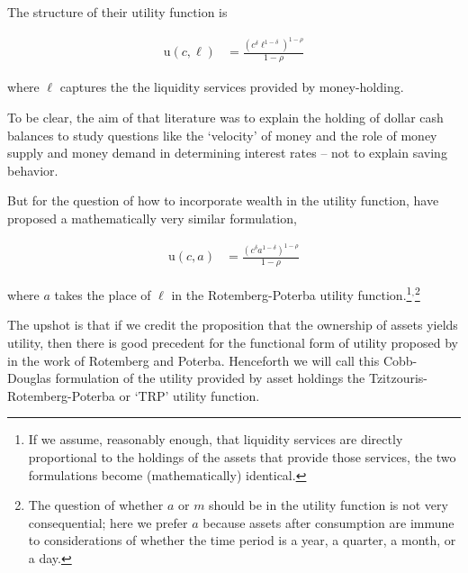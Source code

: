 \documentclass{article}
\newcommand{\CRRA}{\rho}
\newcommand{\uFunc}{\mathrm{u}}
\newcommand{\cNrm}{c}
\newcommand{\aNrm}{a}
\newcommand{\mNrm}{m}
\begin{document}
The structure of their utility function is

\begin{align}
    \uFunc(\cNrm,\ell) & = \frac{\left(
        \cNrm^{\delta}\ell^{1-\delta}
        \right)^{1-\CRRA}}{1-\CRRA}
\end{align}

where $\ell$ captures the the liquidity services provided by money-holding.

To be clear, the aim of that literature was to explain the holding of dollar cash balances to study questions like the `velocity' of money and the role of money supply and money demand in determining interest rates -- not to explain saving behavior.

But for the question of how to incorporate wealth in the utility function, \cite{Tzitzouris_2024} have proposed a mathematically very similar formulation,

\begin{align}
    \uFunc(\cNrm,\aNrm) & = \frac{\left(
        \cNrm^{\delta}\aNrm^{1-\delta}
        \right)^{1-\CRRA}}{1-\CRRA}
\end{align}

where $\aNrm$ takes the place of $\ell$ in the Rotemberg-Poterba utility function.\footnote{If we assume, reasonably enough, that liquidity services are directly proportional to the holdings of the assets that provide those services, the two formulations become (mathematically) identical.}$^{,}$\footnote{The question of whether $\aNrm$ or $\mNrm$ should be in the utility function is not very consequential; here we prefer $\aNrm$ because assets after consumption are immune to considerations of whether the time period is a year, a quarter, a month, or a day.}

The upshot is that if we credit the proposition that the ownership of assets yields utility, then there is good precedent for the functional form of utility proposed by \cite{Tzitzouris_2024} in the work of Rotemberg and Poterba. Henceforth we will call this Cobb-Douglas formulation of the utility provided by asset holdings the Tzitzouris-Rotemberg-Poterba or `TRP' utility function.

\end{document}
